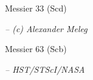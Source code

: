 \documentclass[letterpaper,landscape]{slides}
\begin{document}
\begin{slide}
\begin{center}
{\large \color{red} 
                  Messier 33 (Scd)  }
\end{center}

\begin{center}
\vskip -0.0in
\end{center}

\begin{flushright}
{ \tiny \em -- (c) Alexander Meleg }
\end{flushright}

\vfill
\end{slide}


\begin{slide}
\begin{center}
{\large \color{red} 
                  Messier 63 (Scb)  }
\end{center}

\begin{center}
\vskip -0.0in
\end{center}

\begin{flushright}
{ \tiny \em -- HST/STScI/NASA }
\end{flushright}

\vfill
\end{slide}
\end{document}
